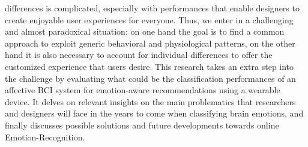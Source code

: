 differences is complicated, especially with performances that enable designers to create enjoyable user experiences for everyone. Thus, we enter in a challenging and almost paradoxical situation: on one hand the goal is to find a common approach to exploit generic behavioral and physiological patterns, on the other hand it is also necessary to account for individual differences to offer the customized experience that users desire. This research takes an extra step into the challenge by evaluating what could be the classification performances of an affective BCI system for emotion-aware recommendations using a wearable device. It delves on relevant insights on the main problematics that researchers and designers will face in the years to come when classifying brain emotions, and finally discusses possible solutions and future developments towards online Emotion-Recognition.

\newpage

